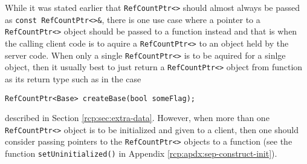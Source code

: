 While it was stated earlier that {}\texttt{Ref\-Count\-Ptr<>} should
almost always be passed as {}\texttt{const Ref\-Count\-Ptr<>\&}, there
is one use case where a pointer to a {}\texttt{Ref\-Count\-Ptr<>}
object should be passed to a function instead and that is when the
calling client code is to aquire a {}\texttt{Ref\-Count\-Ptr<>} to an
object held by the server code.  When only a single
{}\texttt{Ref\-Count\-Ptr<>} is to be aquired for a sinlge object,
then it usually best to just return a {}\texttt{Ref\-Count\-Ptr<>}
object from function as its return type such as in the case

{\scriptsize\begin{verbatim}
RefCountPtr<Base> createBase(bool someFlag);
\end{verbatim}}

{}\noindent{}described in Section {}\ref{rcp:sec:extra-data}.
However, when more than one {}\texttt{Ref\-Count\-Ptr<>} object is to
be initialized and given to a client, then one should consider passing
pointers to the {}\texttt{Ref\-Count\-Ptr<>} objects to a function
(see the function {}\texttt{setUninitialized()} in Appendix
{}\ref{rcp:apdx:sep-construct-init}).
